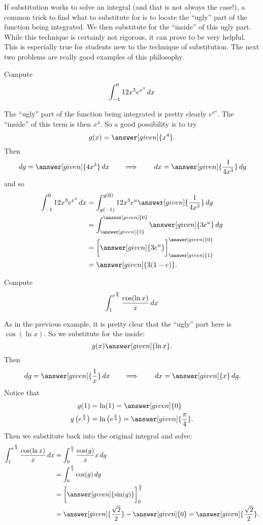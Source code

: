 \documentclass{ximera}
\begin{document}
If substitution works to solve an integral (and that is not always the case!), a common trick to find what to substitute for is to locate the ``ugly'' part of the function being integrated.
We then substitute for the ``inside'' of this ugly part.  
While this technique is certainly not rigorous, it can prove to be very helpful.  
This is especially true for students new to the technique of substitution.  
The next two problems are really good examples of this philosophy.

\begin{example}
Compute
\[
\int_{-1}^0 12x^3 e^{x^4} \,d x
\]
\begin{explanation}
The ``ugly'' part of the function being integrated is pretty clearly $e^{x^4}$.  
The ``inside'' of this term is then $x^4$.  
So a good possibility is to try 
\[
g(x) =  \answer[given]{x^4}.
\]
Then
\[
\d g =  \answer[given]{4x^3} \d x 	\qquad	\Longrightarrow	\qquad	\d x = \answer[given]{\frac{1}{4x^3}} \d g
\]
and so
\begin{align*}
\int_{-1}^0 12x^3 e^{x^4} \d x &= \int_{g(-1)}^{g(0)} 12 x^3 e^u \answer[given]{\frac{1}{4x^3}} \d g  \\
&= \int_{\answer[given]{1}}^{\answer[given]{0}} \answer[given]{3 e^u} \d g  \\
&= \eval{\answer[given]{3e^u}}_{\answer[given]{1}}^{\answer[given]{0}}  \\
&= \answer[given]{3(1-e)}.
\end{align*}
\end{explanation}
\end{example}




\begin{example} Compute
\[
\int_{1}^{e^{\frac{\pi}{4}}} \frac{\cos(\ln x)}{x} \,d x
\]
\begin{explanation}
As in the previous example, it is pretty clear that the ``ugly'' part here is $\cos(\ln x)$.  
So we substitute for the inside:
\[
g(x)\answer[given]{\ln x}.
\]
Then
\[
\d g =  \answer[given]{\frac{1}{x}} \d x 	\qquad	\Longrightarrow	\qquad	\d x = \answer[given]{x} \d g.
\]
Notice that
\begin{align*}
g(1) &= \ln (1) = \answer[given]{0} \\
g \left( e^{\frac{\pi}{4}} \right) &= \ln \left( e^{\frac{\pi}{4}} \right) = \answer[given]{\frac{\pi}{4}}.
\end{align*}
Then we substitute back into the original integral and solve:
\begin{align*}
\int_{1}^{e^{\frac{\pi}{4}}} \frac{\cos(\ln x)}{x} \d x &= \int_0^{\frac{\pi}{4}} \frac{\cos(g)}{x} x \d g  \\
&= \int_0^{\frac{\pi}{4}} \cos(g) \d g  \\
&= \eval{\answer[given]{\sin(g)}}_{0}^{\frac{\pi}{4}}  \\
&= \answer[given]{\frac{\sqrt{2}}{2}} - \answer[given]{0} = \answer[given]{\frac{\sqrt{2}}{2}}.
\end{align*}
\end{explanation}
\end{example}
\end{document}
